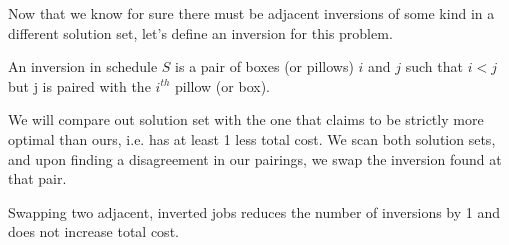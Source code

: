 \documentclass[11pt]{article}
\begin{document}
Now that we know for sure there must be adjacent inversions of some kind in a different solution set, let's define an inversion for this problem.

\begin{defn}An inversion in schedule $S$ is a pair of boxes (or pillows) $i$ and $j$ such that $i <  j$ but j is paired with the $i^{th}$ pillow (or box).\end{defn}

We will compare out solution set with the one that claims to be strictly more optimal than ours, i.e. has at least 1 less total cost. We scan both solution sets, and upon finding a disagreement in our pairings, we swap the inversion found at that pair. 

\begin{claim*}Swapping two adjacent, inverted jobs reduces the number of inversions by 1 and does not increase total cost.\end{claim*}
\end{document}

